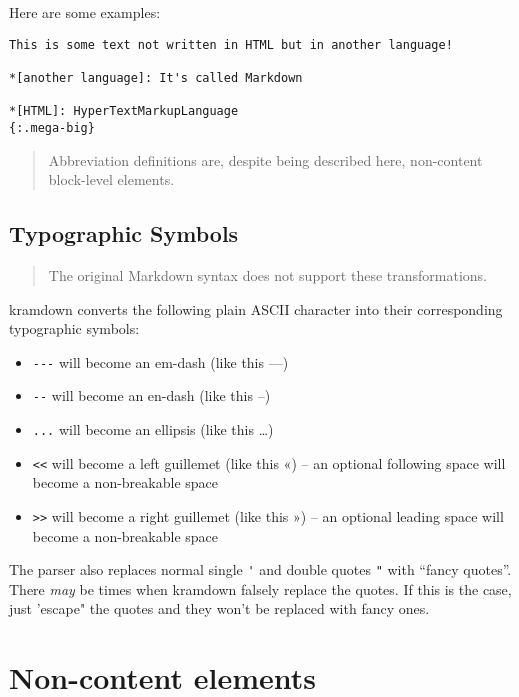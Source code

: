 \documentclass[a4paper]{article}
\begin{document}
Here are some examples:

\begin{verbatim}
This is some text not written in HTML but in another language!

*[another language]: It's called Markdown

*[HTML]: HyperTextMarkupLanguage
{:.mega-big}
\end{verbatim}

\begin{quote}
Abbreviation definitions are, despite being described here, non-content
block-level elements.
\end{quote}

\hypertarget{typographic-symbols}{\subsection{Typographic
Symbols}\label{typographic-symbols}}

\begin{quote}
The original Markdown syntax does not support these transformations.
\end{quote}

kramdown converts the following plain ASCII character into their
corresponding typographic symbols:

\begin{itemize}
\item
  \texttt{-\/-\/-} will become an em-dash (like this ---)
\item
  \texttt{-\/-} will become an en-dash (like this --)
\item
  \texttt{...} will become an ellipsis (like this \ldots{})
\item
  \texttt{\textless{}\textless{}} will become a left guillemet (like
  this «) -- an optional following space will become a non-breakable
  space
\item
  \texttt{\textgreater{}\textgreater{}} will become a right guillemet
  (like this ») -- an optional leading space will become a non-breakable
  space
\end{itemize}

The parser also replaces normal single \verb|'| and
double quotes \verb|"| with ``fancy quotes''. There \emph{may} be
times when kramdown falsely replace the quotes. If this is the case,
just 'escape" the quotes and they won't be replaced with fancy ones.

\hypertarget{non-content-elements}{\section{Non-content
elements}\label{non-content-elements}}
\end{document}
